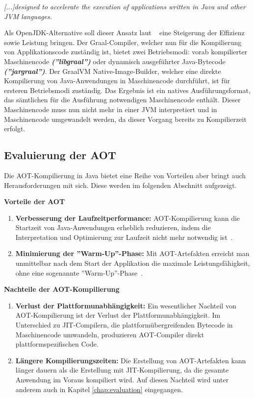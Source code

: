  \begin{spar}
 \textit{[...]designed to accelerate the execution of applications written in Java and other JVM languages.~\parencite{graalvm2023}}
 \end{spar}

 Als OpenJDK-Alternative soll dieser Ansatz laut ~\parencite[vgl.][]{graalvm2023} eine Steigerung der Effizienz sowie Leistung bringen. Der Graal-Compiler, welcher nun für die Kompilierung von Applikationscode zuständig ist, bietet zwei Betriebsmodi: vorab kompilierter Maschinencode \textbf{\textit{(''libgraal'')}} oder dynamisch ausgeführter Java-Bytecode \textbf{\textit{(''jargraal'')}}. Der GraalVM Native-Image-Builder, welcher eine direkte Kompilierung von Java-Anwendungen in Maschinencode durchführt, ist für ersteren Betriebsmodi zuständig. Das Ergebnis ist ein natives Ausführungsformat, das sämtlichen für die Ausführung notwendigen Maschinencode enthält. Dieser Maschinencode muss nun nicht mehr in einer \ac{JVM} interpretiert und in Maschinencode umgewandelt werden, da dieser Vorgang bereits zu Kompilierzeit erfolgt.

\subsection{Evaluierung der \acl{AOT}}
Die \ac{AOT}-Kompilierung in Java bietet eine Reihe von Vorteilen aber bringt auch Herausforderungen mit sich. Diese werden im folgenden Abschnitt aufgezeigt.

 \textbf{Vorteile der \acl{AOT}}
\begin{enumerate}
    \item \textbf{Verbesserung der Laufzeitperformance:} \ac{AOT}-Kompilierung kann die Startzeit von Java-Anwendungen erheblich reduzieren, indem die Interpretation und Optimierung zur Laufzeit nicht mehr notwendig ist~\parencite[vgl.][]{9678709}.

     \item \textbf{Minimierung der ''Warm-Up''-Phase:} Mit \ac{AOT}-Artefakten erreicht man unmittelbar nach dem Start der Applikation die maximale Leistungsfähigkeit, ohne eine sogenannte ''Warm-Up''-Phase~\parencite[vgl.][]{9678709}. 
\end{enumerate}
 \textbf{Nachteile der \acl{AOT}-Kompilierung}
\begin{enumerate}
    \item \textbf{Verlust der Plattformunabhängigkeit:} Ein wesentlicher Nachteil von \ac{AOT}-Kompilierung ist der Verlust der Plattformunabhängigkeit. Im Unterschied zu \ac{JIT}-Compilern, die plattformübergreifenden Bytecode in Maschinencode umwandeln, produzieren \ac{AOT}-Compiler direkt plattformspezifischen Code. 
    
    \item \textbf{Längere Kompilierungszeiten:} Die Erstellung von \ac{AOT}-Artefakten kann länger dauern als die Erstellung mit \ac{JIT}-Kompilierung, da die gesamte Anwendung im Voraus kompiliert wird. Auf diesen Nachteil wird unter anderem auch in Kapitel \ref{chap:evaluation} eingegangen.

\end{enumerate}

